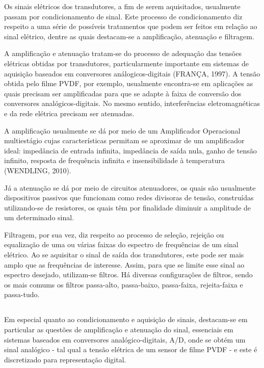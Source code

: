 \documentclass[
	12pt,				
	oneside,			
	a4paper,			
	english,			
	brazil,			
	]{abntex2ppgsi}
\begin{document}
Os sinais elétricos dos transdutores, a fim de serem aquisitados, usualmente passam por condicionamento de sinal. Este processo de condicionamento diz respeito a uma série de possíveis tratamentos que podem ser feitos em relação ao sinal elétrico, dentre as quais destacam-se a amplificação, atenuação e filtragem. 

A amplificação e atenuação tratam-se do processo de adequação das tensões elétricas obtidas por transdutores, particularmente importante em sistemas de aquisição baseados em conversores análogicos-digitais (FRANÇA, 1997). A tensão obtida pelo filme PVDF, por exemplo, usualmente encontra-se em aplicações as quais precisam ser amplificadas para que se adapte à faixa de conversão dos conversores analógicos-digitais. No mesmo sentido, interferências eletromagnéticas e da rede elétrica precisam ser atenuadas. 

A amplificação usualmente se dá por meio de um Amplificador Operacional multiestágio cujas características permitam se aproximar de um amplificador ideal: impedância de entrada infinita, impedância de saída nula, ganho de tensão infinito, resposta de frequência infinita e insensibilidade à temperatura (WENDLING, 2010). 

Já a atenuação se dá por meio de circuitos atenuadores, os quais são usualmente dispositivos passivos que funcionam como redes divisoras de tensão, construídas utilizando-se de resistores, os quais têm por finalidade diminuir a amplitude de um determinado sinal.


Filtragem, por sua vez, diz respeito ao processo de seleção, rejeição ou equalização de uma ou várias faixas do espectro de frequências de um sinal elétrico. Ao se aquisitar o sinal de saída dos transdutores, este pode ser mais amplo que as frequências de interesse. Assim, para que se limite esse sinal ao espectro desejado, utilizam-se filtros. Há diversas configurações de filtros, sendo os mais comums os filtros passa-alto, passa-baixo, passa-faixa, rejeita-faixa e passa-tudo. 


\subsection{}


Em especial quanto ao condicionamento e aquisição de sinais, destacam-se em particular as questões de amplificação e atenuação do sinal, essenciais em sistemas baseados em conversores analógico-digitais, A/D, onde se obtém um sinal analógico - tal qual a tensão elétrica de um sensor de filme PVDF - e este é discretizado para representação digital. 
\end{document}
